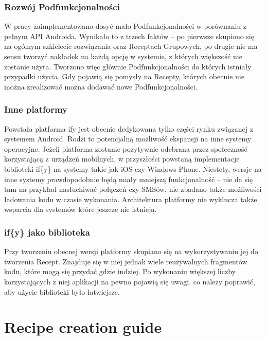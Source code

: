 \documentclass[11pt,a4paper,polish,thesis]{dcsbook}
\begin{document}
\subsection{Rozwój Podfunkcjonalności}
W pracy zaimplementowano dosyć mało Podfunkcjonalności w porównaniu z pełnym API Androida. Wynikało to z trzech faktów -- po pierwsze skupiono się na ogólnym szkielecie rozwiązania oraz Receptach Grupowych, po drugie nie ma sensu tworzyć nakładek na każdą opcję w systemie, z których większość nie zostanie użyta. Tworzono więc głównie Podfunkcjonalności do których istniały przypadki użycia. Gdy pojawią się pomysły na Recepty, których obecnie nie można zrealizować można dodawać nowe Podfunkcjonalności. 
\subsection{Inne platformy}
Powstała platforma if{y} jest obecnie dedykowana tylko części rynku związanej z systemem Android. Rodzi to potencjalną możliwość ekspansji na inne systemy operacyjne. 
Jeżeli platforma zostanie pozytywnie odebrana przez społeczność korzystającą z urządzeń mobilnych, w przyszłości powstaną implementacje biblioteki if\{y\} na systemy
takie jak iOS czy Windows Phone. Niestety, wersje na inne systemy prawdopodobnie będą miały mniejszą funkcjonalność -- nie da się tam na przykład nasłuchiwać połączeń czy SMSów, nie zbadano także możliwości ładowania kodu w czasie wykonania. Architektura platformy nie wyklucza także wsparcia dla systemów które jeszcze nie istnieją.
\subsection{if\{y\} jako biblioteka}
Przy tworzeniu obecnej wersji platformy skupiano się na wykorzystywaniu jej do tworzenia Recept. Znajduje się w niej jednak wiele reużywalnych fragmentów kodu, które mogą się przydać gdzie indziej. Po wykonaniu większej liczby korzystających z niej aplikacji na pewno pojawią się uwagi, co należy poprawić, aby użycie biblioteki było łatwiejsze.

\appendix 

\chapter{Recipe creation guide}
\end{document}
